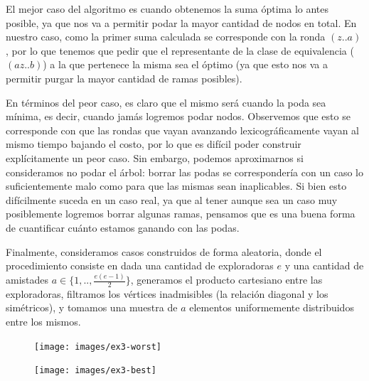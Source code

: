 \documentclass{article}
\theoremstyle{definition}
\theoremstyle{remark}
\begin{document}
El mejor caso del algoritmo es cuando obtenemos la suma óptima lo antes posible, ya que nos va a permitir podar la mayor cantidad de nodos en total. En nuestro caso, como la primer suma calculada se corresponde con la ronda $(z..a)$, por lo que tenemos que pedir que el representante de la clase de equivalencia ($(a z .. b)$) a la que pertenece la misma sea el óptimo (ya que esto nos va a permitir purgar la mayor cantidad de ramas posibles).

En términos del peor caso, es claro que el mismo será cuando la poda sea mínima, es decir, cuando jamás logremos podar nodos. Observemos que esto se corresponde con que las rondas que vayan avanzando lexicográficamente vayan al mismo tiempo bajando el costo, por lo que es difícil poder construir explícitamente un peor caso. Sin embargo, podemos aproximarnos si consideramos no podar el árbol: borrar las podas se correspondería con un caso lo suficientemente malo como para que las mismas sean inaplicables. Si bien esto difícilmente suceda en un caso real, ya que al tener aunque sea un caso muy posiblemente logremos borrar algunas ramas, pensamos que es una buena forma de cuantificar cuánto estamos ganando con las podas.

Finalmente, consideramos casos construidos de forma aleatoria, donde el procedimiento consiste en dada una cantidad de exploradoras $e$ y una cantidad de amistades $a \in \{1, .., \frac{e(e-1)}{2}\}$, generamos el producto cartesiano entre las exploradoras, filtramos los vértices inadmisibles (la relación diagonal y los simétricos), y tomamos una muestra de $a$ elementos uniformemente distribuidos entre los mismos.

\begin{figure}[h!]
\centering
\label{grf:ex3-worst}
\texttt{[image: images/ex3-worst]}
\caption{}
\end{figure}

\begin{figure}[h!]
\centering
\label{grf:ex3-best}
\texttt{[image: images/ex3-best]}
\caption{}
\end{figure}
\end{document}
